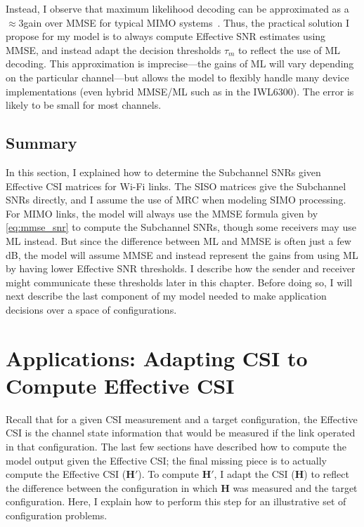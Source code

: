 Instead, I observe that maximum likelihood decoding can be approximated as a $\approx$3\dB gain over MMSE for typical MIMO systems~\cite{Kumar_ml_mmse}. Thus, the practical solution I propose for my model is to always compute Effective SNR estimates using MMSE, and instead adapt the decision thresholds $\tau_m$ to reflect the use of ML decoding. This approximation is imprecise---the gains of ML will vary depending on the particular channel---but allows the model to flexibly handle many device implementations (even hybrid MMSE/ML such as in the IWL6300). The error is likely to be small for most channels.

\subsection{Summary}
In this section, I explained how to determine the Subchannel SNRs given Effective CSI matrices for Wi-Fi links. The SISO matrices give the Subchannel SNRs directly, and I assume the use of MRC when modeling SIMO processing.
For MIMO links, the model will always use the MMSE formula given by \eqref{eq:mmse_snr} to compute the Subchannel SNRs, though some receivers may use ML instead. But since the difference between ML and MMSE is often just a few dB, the model will assume MMSE and instead represent the gains from using ML by having lower Effective SNR thresholds. I describe how the sender and receiver might communicate these thresholds later in this chapter. Before doing so, I will next describe the last component of my model needed to make application decisions over a space of configurations.

\section{Applications: Adapting CSI to Compute Effective CSI}
\label{sec:model_applications}
Recall that for a given CSI measurement and a target configuration, the Effective CSI is the channel state information that would be measured if the link operated in that configuration. The last few sections have described how to compute the model output given the Effective CSI; the final missing piece is to actually compute the Effective CSI ($\mathbf{H}'$). To compute $\mathbf{H}'$, I adapt the CSI ($\mathbf{H}$) to reflect the difference between the configuration in which $\mathbf{H}$ was measured and the target configuration. Here, I explain how to perform this step for an illustrative set of configuration problems.

